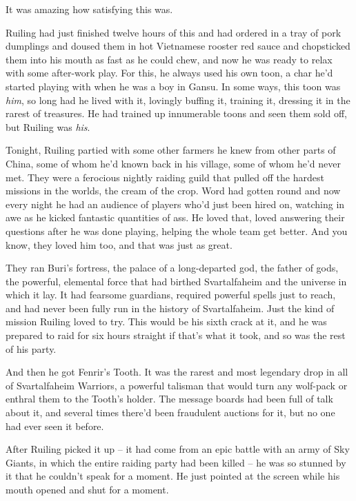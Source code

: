 It was amazing how satisfying this was.

Ruiling had just finished twelve hours of this and had ordered in a
tray of pork dumplings and doused them in hot Vietnamese rooster
red sauce and chopsticked them into his mouth as fast as he could
chew, and now he was ready to relax with some after-work play. For
this, he always used his own toon, a char he'd started playing with
when he was a boy in Gansu. In some ways, this toon was \emph{him},
so long had he lived with it, lovingly buffing it, training it,
dressing it in the rarest of treasures. He had trained up
innumerable toons and seen them sold off, but Ruiling was
\emph{his}.

Tonight, Ruiling partied with some other farmers he knew from other
parts of China, some of whom he'd known back in his village, some
of whom he'd never met. They were a ferocious nightly raiding guild
that pulled off the hardest missions in the worlds, the cream of
the crop. Word had gotten round and now every night he had an
audience of players who'd just been hired on, watching in awe as he
kicked fantastic quantities of ass. He loved that, loved answering
their questions after he was done playing, helping the whole team
get better. And you know, they loved him too, and that was just as
great.

They ran Buri's fortress, the palace of a long-departed god, the
father of gods, the powerful, elemental force that had birthed
Svartalfaheim and the universe in which it lay. It had fearsome
guardians, required powerful spells just to reach, and had never
been fully run in the history of Svartalfaheim. Just the kind of
mission Ruiling loved to try. This would be his sixth crack at it,
and he was prepared to raid for six hours straight if that's what
it took, and so was the rest of his party.

And then he got Fenrir's Tooth. It was the rarest and most
legendary drop in all of Svartalfaheim Warriors, a powerful
talisman that would turn any wolf-pack or enthral them to the
Tooth's holder. The message boards had been full of talk about it,
and several times there'd been fraudulent auctions for it, but no
one had ever seen it before.

After Ruiling picked it up -- it had come from an epic battle with
an army of Sky Giants, in which the entire raiding party had been
killed -- he was so stunned by it that he couldn't speak for a
moment. He just pointed at the screen while his mouth opened and
shut for a moment.

